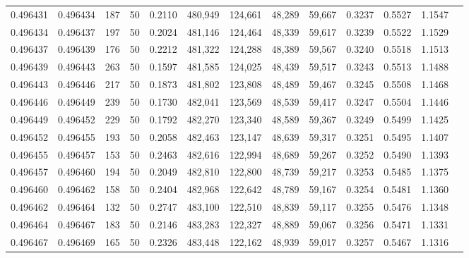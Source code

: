 \begin{tabular}{rrrrrrrrrrrrr}
0.496431 & 0.496434 &   187 &  50 &                                     0.2110 & 480,949 & 124,661 &  48,289 &  59,667 & 0.3237 & 0.5527 & 1.1547 \\
0.496434 & 0.496437 &   197 &  50 &                                     0.2024 & 481,146 & 124,464 &  48,339 &  59,617 & 0.3239 & 0.5522 & 1.1529 \\
0.496437 & 0.496439 &   176 &  50 &                                     0.2212 & 481,322 & 124,288 &  48,389 &  59,567 & 0.3240 & 0.5518 & 1.1513 \\
0.496439 & 0.496443 &   263 &  50 &                                     0.1597 & 481,585 & 124,025 &  48,439 &  59,517 & 0.3243 & 0.5513 & 1.1488 \\
0.496443 & 0.496446 &   217 &  50 &                                     0.1873 & 481,802 & 123,808 &  48,489 &  59,467 & 0.3245 & 0.5508 & 1.1468 \\
0.496446 & 0.496449 &   239 &  50 &                                     0.1730 & 482,041 & 123,569 &  48,539 &  59,417 & 0.3247 & 0.5504 & 1.1446 \\
0.496449 & 0.496452 &   229 &  50 &                                     0.1792 & 482,270 & 123,340 &  48,589 &  59,367 & 0.3249 & 0.5499 & 1.1425 \\
0.496452 & 0.496455 &   193 &  50 &                                     0.2058 & 482,463 & 123,147 &  48,639 &  59,317 & 0.3251 & 0.5495 & 1.1407 \\
0.496455 & 0.496457 &   153 &  50 &                                     0.2463 & 482,616 & 122,994 &  48,689 &  59,267 & 0.3252 & 0.5490 & 1.1393 \\
0.496457 & 0.496460 &   194 &  50 &                                     0.2049 & 482,810 & 122,800 &  48,739 &  59,217 & 0.3253 & 0.5485 & 1.1375 \\
0.496460 & 0.496462 &   158 &  50 &                                     0.2404 & 482,968 & 122,642 &  48,789 &  59,167 & 0.3254 & 0.5481 & 1.1360 \\
0.496462 & 0.496464 &   132 &  50 &                                     0.2747 & 483,100 & 122,510 &  48,839 &  59,117 & 0.3255 & 0.5476 & 1.1348 \\
0.496464 & 0.496467 &   183 &  50 &                                     0.2146 & 483,283 & 122,327 &  48,889 &  59,067 & 0.3256 & 0.5471 & 1.1331 \\
0.496467 & 0.496469 &   165 &  50 &                                     0.2326 & 483,448 & 122,162 &  48,939 &  59,017 & 0.3257 & 0.5467 & 1.1316 \\

\end{tabular}
